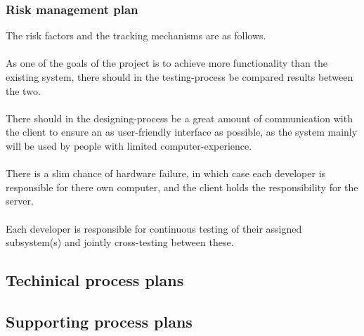 \documentclass[12pt]{article}
\begin{document}
\subsubsection{Risk management plan}
The risk factors and the tracking mechanisms are as follows. \\\\
As one of the goals of the project is to achieve more functionality than the existing system, there should in the testing-process be compared results between the two. \\\\
There should in the designing-process be a great amount of communication with the client to ensure an as user-friendly interface as possible, as the system mainly will be used by people with limited computer-experience. \\\\
There is a slim chance of hardware failure, in which case each developer is responsible for there own computer, and the client holds the responsibility for the server. \\\\
Each developer is responsible for continuous testing of their assigned subsystem(s) and jointly cross-testing between these. 
\subsection{Techinical process plans}
\subsection{Supporting process plans}
\end{document}
